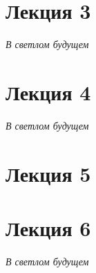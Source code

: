 


    
    \newpage
    \hypertarget{intro}{}
    \tableofcontents
    \newpage
    
    
    
    
    
    \section{Лекция 3}
    \textit{В светлом будущем}

    \section{Лекция 4}
    \textit{В светлом будущем}
    
    \section{Лекция 5}
    
     
    \section{Лекция 6}
    \textit{В светлом будущем}
        
    
    \newpage
    
